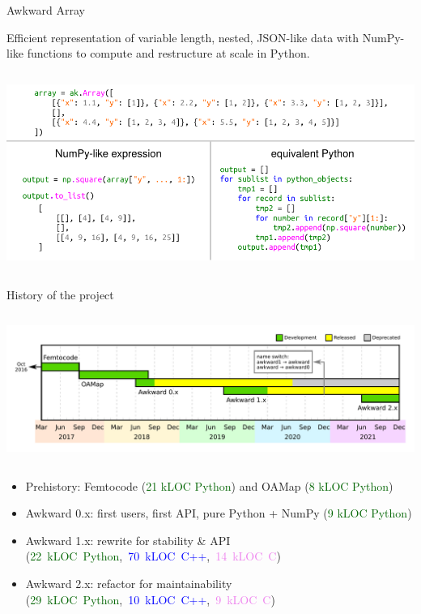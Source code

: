 \documentclass[aspectratio=169]{beamer}
\begin{document}
\begin{frame}{Awkward Array}
\large
\vspace{0.25 cm}

Efficient representation of variable length, nested, JSON-like data with NumPy-like functions to compute and restructure at scale in Python.

\begin{columns}
\includegraphics[width=\linewidth]{pivarski-one-slide-summary.pdf}
\end{columns}
\end{frame}

\begin{frame}{History of the project}

\begin{columns}
\includegraphics[width=\linewidth]{awkward-timeline.pdf}
\end{columns}

\begin{itemize}
\item Prehistory: Femtocode {\small (\textcolor{darkgreen}{21 kLOC Python})} and OAMap {\small (\textcolor{darkgreen}{8 kLOC Python})}
\item Awkward 0.x: first users, first API, pure Python + NumPy {\small (\textcolor{darkgreen}{9 kLOC Python})}
\item Awkward 1.x: rewrite for stability \& API \mbox{\small (\textcolor{darkgreen}{22 kLOC Python}, \textcolor{blue}{70 kLOC C++}, \textcolor{violet}{14 kLOC C})\hspace{-0.5 cm}}
\item Awkward 2.x: refactor for maintainability \mbox{\small (\textcolor{darkgreen}{29 kLOC Python}, \textcolor{blue}{10 kLOC C++}, \textcolor{violet}{9 kLOC C})\hspace{-0.5 cm}}
\end{itemize}
\end{frame}
\end{document}
